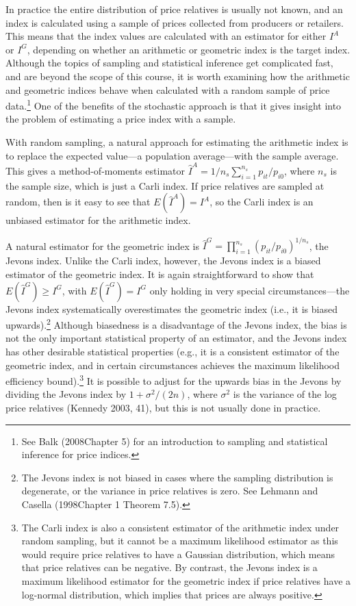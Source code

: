 \documentclass[
]{article}
\begin{document}
In practice the entire distribution of price relatives is usually not known, and an index is calculated using a sample of prices collected from producers or retailers. This means that the index values are calculated with an estimator for either \(I^{A}\) or \(I^{G}\), depending on whether an arithmetic or geometric index is the target index. Although the topics of sampling and statistical inference get complicated fast, and are beyond the scope of this course, it is worth examining how the arithmetic and geometric indices behave when calculated with a random sample of price data.\footnote{See Balk (2008Chapter 5) for an introduction to sampling and statistical inference for price indices.} One of the benefits of the stochastic approach is that it gives insight into the problem of estimating a price index with a sample.

With random sampling, a natural approach for estimating the arithmetic index is to replace the expected value---a population average---with the sample average. This gives a method-of-moments estimator \(\hat{I}^A = 1 / n_{s} \sum_{i = 1}^{n_{s}} p_{it} / p_{i0}\), where \(n_{s}\) is the sample size, which is just a Carli index. If price relatives are sampled at random, then is it easy to see that \(E(\hat{I}^{A}) = I^{A}\), so the Carli index is an unbiased estimator for the arithmetic index.

A natural estimator for the geometric index is \(\hat{I}^{G} = \prod_{i = 1}^{n_{s}} (p_{it} / p_{i0})^{1 / n_{s}}\), the Jevons index. Unlike the Carli index, however, the Jevons index is a biased estimator of the geometric index. It is again straightforward to show that \(E(\hat{I}^{G}) \geq I^{G}\), with \(E(\hat{I}^{G}) = I^{G}\) only holding in very special circumstances---the Jevons index systematically overestimates the geometric index (i.e., it is biased upwards).\footnote{The Jevons index is not biased in cases where the sampling distribution is degenerate, or the variance in price relatives is zero. See Lehmann and Casella (1998Chapter 1 Theorem 7.5).} Although biasedness is a disadvantage of the Jevons index, the bias is not the only important statistical property of an estimator, and the Jevons index has other desirable statistical properties (e.g., it is a consistent estimator of the geometric index, and in certain circumstances achieves the maximum likelihood efficiency bound).\footnote{The Carli index is also a consistent estimator of the arithmetic index under random sampling, but it cannot be a maximum likelihood estimator as this would require price relatives to have a Gaussian distribution, which means that price relatives can be negative. By contrast, the Jevons index is a maximum likelihood estimator for the geometric index if price relatives have a log-normal distribution, which implies that prices are always positive.} It is possible to adjust for the upwards bias in the Jevons by dividing the Jevons index by \(1 + \sigma^{2}/(2n)\), where \(\sigma^{2}\) is the variance of the log price relatives (Kennedy 2003, 41), but this is not usually done in practice.
\end{document}
